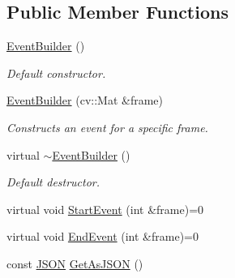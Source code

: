 \subsection*{Public Member Functions}
\begin{DoxyCompactItemize}
\item 
\mbox{\label{class_event_builder_ac0b0fb04d24202c381a11e277f28ec4d}} 
\mbox{\hyperlink{class_event_builder_ac0b0fb04d24202c381a11e277f28ec4d}{Event\+Builder}} ()
\begin{DoxyCompactList}\small\item\em Default constructor. \end{DoxyCompactList}\item 
\mbox{\label{class_event_builder_a468553f33434b65e69ac2f6ad2edc1c4}} 
\mbox{\hyperlink{class_event_builder_a468553f33434b65e69ac2f6ad2edc1c4}{Event\+Builder}} (cv\+::\+Mat \&frame)
\begin{DoxyCompactList}\small\item\em Constructs an event for a specific frame. \end{DoxyCompactList}\item 
\mbox{\label{class_event_builder_ac47bf247b502763624d547cb0378ed73}} 
virtual \mbox{\hyperlink{class_event_builder_ac47bf247b502763624d547cb0378ed73}{$\sim$\+Event\+Builder}} ()
\begin{DoxyCompactList}\small\item\em Default destructor. \end{DoxyCompactList}\item 
virtual void \mbox{\hyperlink{class_event_builder_a62435c441382ebf14191b5b0c17904e3}{Start\+Event}} (int \&frame)=0
\item 
virtual void \mbox{\hyperlink{class_event_builder_ac55f925287ac8aed2d5303706444251e}{End\+Event}} (int \&frame)=0
\item 
const \mbox{\hyperlink{class_j_s_o_n}{J\+S\+ON}} \mbox{\hyperlink{class_event_builder_aac866d98d3b7aa7ac4c46d26cf7cf0ff}{Get\+As\+J\+S\+ON}} ()
\end{DoxyCompactItemize}
